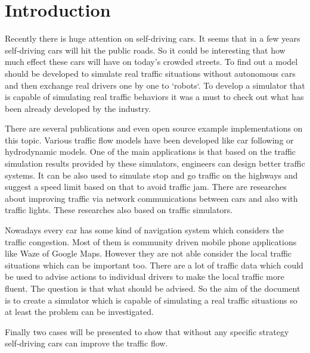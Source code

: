 \chapter{Introduction}
Recently there is huge attention on self-driving cars. It seems that in a few years self-driving cars will hit the public roads. So it could be interesting that how much effect these cars will have on today's crowded streets. To find out a model should be developed to simulate real traffic situations without autonomous cars and then exchange real drivers one by one to `robots`. To develop a simulator that is capable of simulating real traffic behaviors it was a must to check out what has been already developed by the industry.

There are several publications and even open source example implementations on this topic. Various traffic flow models have been developed like car following or hydrodynamic models. One of the main applications is that based on the traffic simulation results provided by these simulators, engineers can design better traffic systems. It can be also used to simulate stop and go traffic on the highways and suggest a speed limit based on that to avoid traffic jam. There are researches about improving traffic via network communications between cars and also with traffic lights. These researches also based on traffic simulators.

Nowadays every car has some kind of navigation system which considers the traffic congestion. Most of them is community driven mobile phone applications like Waze of Google Maps. However they are not able consider the local traffic situations which can be important too. There are a lot of traffic data which could be used to advise actions to individual drivers to make the local traffic more fluent. The question is that what should be advised. So the aim of the document is to create a simulator which is capable of simulating a real traffic situations so at least the problem can be investigated.

Finally two cases will be presented to show that without any specific strategy self-driving cars can improve the traffic flow.